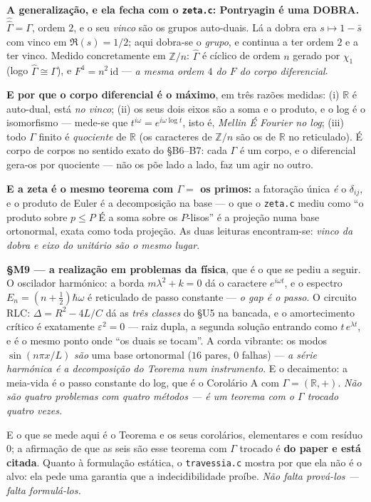 \documentclass[11pt]{article}
\newcommand{\code}[1]{\texttt{\small #1}}
\newcommand{\Z}{\mathbb Z}
\newcommand{\R}{\mathbb R}
\theoremstyle{plain}
\theoremstyle{remark}
\begin{document}
\begin{itemize}
\textbf{A generalização, e ela fecha com o \code{zeta.c}: Pontryagin é uma DOBRA.} $\hat{\hat\Gamma}
= \Gamma$, ordem $2$, e o seu \emph{vinco} são os grupos auto-duais. Lá a dobra era $s\mapsto1-\bar
s$ com vinco em $\Re(s)=1/2$; aqui dobra-se o \emph{grupo}, e continua a ter ordem $2$ e a ter
vinco. Medido concretamente em $\Z/n$: $\hat\Gamma$ é cíclico de ordem $n$ gerado por $\chi_1$
(logo $\hat\Gamma\cong\Gamma$), e $F^4=n^2\,\mathrm{id}$ --- \emph{a mesma ordem $4$ do $F$ do corpo
diferencial}.

\textbf{E por que o corpo diferencial é o máximo}, em três razões medidas: (i) $\R$ é auto-dual,
está \emph{no vinco}; (ii) os seus dois eixos são a soma e o produto, e o log é o isomorfismo ---
mede-se que $t^{i\omega}=e^{i\omega\log t}$, isto é, \emph{Mellin É Fourier no log}; (iii) todo
$\Gamma$ finito é \emph{quociente} de $\R$ (os caracteres de $\Z/n$ são os de $\R$ no reticulado).
É corpo de corpos no sentido exato do §B6--B7: cada $\Gamma$ é um corpo, e o diferencial gera-os
por quociente --- não os põe lado a lado, faz um agir no outro.

\textbf{E a zeta é o mesmo teorema com $\Gamma=$ os primos:} a fatoração única \emph{é} o
$\delta_{ij}$, e o produto de Euler é a decomposição na base --- o que o \code{zeta.c} mediu como
``o produto sobre $p\le P$ É a soma sobre os $P$-lisos'' é a projeção numa base ortonormal, exata
como toda projeção. As duas leituras encontram-se: \emph{vinco da dobra e eixo do unitário são o
mesmo lugar}.

\textbf{§M9 --- a realização em problemas da física}, que é o que se pediu a seguir. O
oscilador harmónico: a borda $m\lambda^2+k=0$ dá o caractere $e^{i\omega t}$, e o espectro
$E_n=(n+\frac12)\hbar\omega$ é reticulado de passo constante --- \emph{o gap é o passo}. O circuito
RLC: $\Delta=R^2-4L/C$ dá as \emph{três classes} do §U5 na bancada, e o amortecimento crítico é
exatamente $\varepsilon^2=0$ --- raiz dupla, a segunda solução entrando como $t\,e^{\lambda t}$, e é
o mesmo ponto onde ``os duais se tocam''. A corda vibrante: os modos $\sin(n\pi x/L)$ \emph{são}
uma base ortonormal ($16$ pares, $0$ falhas) --- \emph{a série harmónica é a decomposição do
Teorema num instrumento}. E o decaimento: a meia-vida é o passo constante do log, que é o
Corolário A com $\Gamma=(\R,+)$. \emph{Não são quatro problemas com quatro métodos --- é um teorema
com o $\Gamma$ trocado quatro vezes.}

E o que se mede aqui é o Teorema e os seus corolários, elementares e com resíduo $0$; a afirmação
de que as seis são esse teorema com $\Gamma$ trocado é \textbf{do paper e está citada}. Quanto à
formulação estática, o \code{travessia.c} mostra por que ela não é o alvo: ela pede uma garantia
que a indecidibilidade proíbe. \emph{Não falta prová-los --- falta formulá-los.}


\end{itemize}
\end{document}
